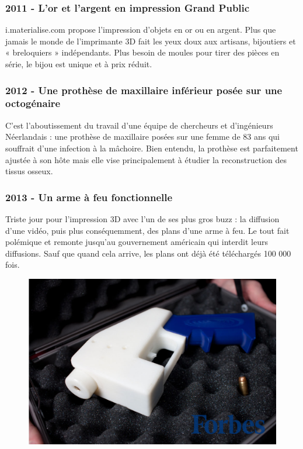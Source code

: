 \documentclass{article}
\begin{document}
\subsubsection{2011 - L'or et l'argent en impression Grand Public}
i.materialise.com propose l'impression d'objets en or ou en argent. Plus que jamais le monde de l'imprimante 3D fait les yeux doux aux artisans, bijoutiers et « breloquiers » indépendants. Plus besoin de moules pour tirer des pièces en série, le bijou est unique et à prix réduit.
\subsubsection{2012 - Une prothèse de maxillaire inférieur posée sur une octogénaire}
C'est l'aboutissement du travail d'une équipe de chercheurs et d'ingénieurs Néerlandais : une prothèse de maxillaire posées sur une femme de 83 ans qui souffrait d'une infection à la mâchoire. Bien entendu, la prothèse est parfaitement ajustée à son hôte mais elle vise principalement à étudier la reconstruction des tissus osseux.
\subsubsection{2013 - Un arme à feu fonctionnelle}
Triste jour pour l'impression 3D avec l'un de ses plus gros buzz : la diffusion d'une vidéo, puis plus conséquemment, des plans d'une arme à feu. Le tout fait polémique et remonte jusqu'au gouvernement américain qui interdit leurs diffusions. Sauf que quand cela arrive, les plans ont déjà été téléchargés 100 000 fois.
\begin{figure}[h!]
\centering
\includegraphics[scale=0.3]{./images/liberator.png}
\end{figure}
\end{document}
